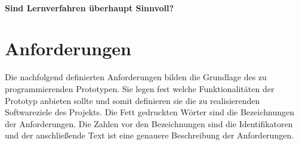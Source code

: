 \paragraph{Sind Lernverfahren überhaupt Sinnvoll?}

\section{Anforderungen}
\label{sec:Anforderungen}
Die nachfolgend definierten Anforderungen bilden die Grundlage des zu programmierenden Prototypen. Sie legen fest welche Funktionalitäten der Prototyp anbieten sollte und somit definieren sie die zu realisierenden Softwareziele des Projekts. Die Fett gedruckten Wörter sind die Bezeichnungen der Anforderungen. Die Zahlen vor den Bezeichnungen sind die Identifikatoren und der anschließende Text ist eine genauere Beschreibung der Anforderungen. \\


